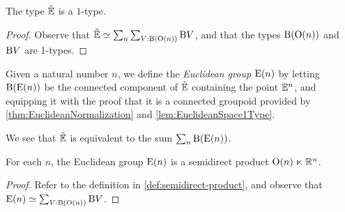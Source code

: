 \begin{lemma}\label{lem:EuclideanSpace1Type}
  The type ${\tilde {\mathbb E}}$ is a $1$-type.
\end{lemma}

\begin{proof}
  Observe that ${\tilde {\mathbb E}} \simeq \sum_n \sum_{V:\mathrm B ( \mathrm O(n) )} \mathrm B V$, and that the
  types $\mathrm B ( \mathrm O(n) )$ and $\mathrm B V$ are 1-types.
\end{proof}

\begin{definition}\label{def:EuclideanGroup}
  Given a natural number $n$, we define the {\em Euclidean group} $\mathrm E(n)$ by
  letting $\mathrm B (\mathrm E(n))$ be the connected component of ${\tilde {\mathbb E}}$ containing the
  point $\mathbb E^n$, and equipping it with the proof that it is a connected
  groupoid provided by \cref{thm:EuclideanNormalization} and
  \cref{lem:EuclideanSpace1Type}.
\end{definition}

We see that ${\tilde {\mathbb E}}$ is equivalent to the sum $\sum_n \mathrm B (\mathrm E(n))$.

\begin{theorem}\label{thm:EuclideanGroupSemidirect}
  For each $n$, the Euclidean group $\mathrm E(n)$ is a semidirect product
  $\mathrm O(n) \ltimes \mathbb{R}^n$.
\end{theorem}

\begin{proof}
  Refer to the definition in \cref{def:semidirect-product}, and observe that
  $\mathrm E(n) \simeq \sum_{V:\mathrm B ( \mathrm O(n) )} \mathrm B V$.
\end{proof}
